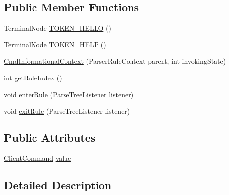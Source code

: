 \subsection*{Public Member Functions}
\begin{DoxyCompactItemize}
\item 
Terminal\+Node \hyperlink{classgov_1_1nasa_1_1jpf_1_1inspector_1_1client_1_1parser_1_1_console_grammar_parser_1_1_cmd_informational_context_a124a7338e913726baf8ede1648e0c8f4}{T\+O\+K\+E\+N\+\_\+\+H\+E\+L\+LO} ()
\item 
Terminal\+Node \hyperlink{classgov_1_1nasa_1_1jpf_1_1inspector_1_1client_1_1parser_1_1_console_grammar_parser_1_1_cmd_informational_context_ada0ddbf7349119ffe58b2378a1cc1162}{T\+O\+K\+E\+N\+\_\+\+H\+E\+LP} ()
\item 
\hyperlink{classgov_1_1nasa_1_1jpf_1_1inspector_1_1client_1_1parser_1_1_console_grammar_parser_1_1_cmd_informational_context_a1af4ae4816b55932bb8a4f14ea5056ed}{Cmd\+Informational\+Context} (Parser\+Rule\+Context parent, int invoking\+State)
\item 
int \hyperlink{classgov_1_1nasa_1_1jpf_1_1inspector_1_1client_1_1parser_1_1_console_grammar_parser_1_1_cmd_informational_context_ae7cadfb11fa6e8f9f89bae5c09f7cf25}{get\+Rule\+Index} ()
\item 
void \hyperlink{classgov_1_1nasa_1_1jpf_1_1inspector_1_1client_1_1parser_1_1_console_grammar_parser_1_1_cmd_informational_context_a0a3d7c6de154d142ee2d8b50999bd1b5}{enter\+Rule} (Parse\+Tree\+Listener listener)
\item 
void \hyperlink{classgov_1_1nasa_1_1jpf_1_1inspector_1_1client_1_1parser_1_1_console_grammar_parser_1_1_cmd_informational_context_a939775436ae9e878dee0dde609be0a9f}{exit\+Rule} (Parse\+Tree\+Listener listener)
\end{DoxyCompactItemize}
\subsection*{Public Attributes}
\begin{DoxyCompactItemize}
\item 
\hyperlink{classgov_1_1nasa_1_1jpf_1_1inspector_1_1client_1_1_client_command}{Client\+Command} \hyperlink{classgov_1_1nasa_1_1jpf_1_1inspector_1_1client_1_1parser_1_1_console_grammar_parser_1_1_cmd_informational_context_a1cb752c3fe7b59f878a38bf22f47f794}{value}
\end{DoxyCompactItemize}


\subsection{Detailed Description}


